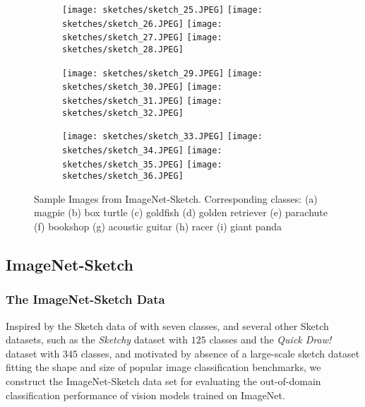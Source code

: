 \documentclass{article}
\begin{document}
\begin{figure}
\begin{subfigure}{.1\textwidth}
  \centering
  \texttt{[image: sketches/sketch\_25.JPEG]}
  \texttt{[image: sketches/sketch\_26.JPEG]}
  \texttt{[image: sketches/sketch\_27.JPEG]}
  \texttt{[image: sketches/sketch\_28.JPEG]}
  \caption{}
\end{subfigure}
\begin{subfigure}{.1\textwidth}
  \centering
  \texttt{[image: sketches/sketch\_29.JPEG]}
  \texttt{[image: sketches/sketch\_30.JPEG]}
  \texttt{[image: sketches/sketch\_31.JPEG]}
  \texttt{[image: sketches/sketch\_32.JPEG]}
  \caption{}
\end{subfigure}
\begin{subfigure}{.1\textwidth}
  \centering
  \texttt{[image: sketches/sketch\_33.JPEG]}
  \texttt{[image: sketches/sketch\_34.JPEG]}
  \texttt{[image: sketches/sketch\_35.JPEG]}
  \texttt{[image: sketches/sketch\_36.JPEG]}
  \caption{}
\end{subfigure}

\caption{Sample Images from ImageNet-Sketch. Corresponding classes: (a) magpie (b) box turtle (c) goldfish (d) golden retriever (e) parachute (f) bookshop (g) acoustic guitar (h) racer (i) giant panda}
\label{fig:sketch}
\end{figure}

\subsection{ImageNet-Sketch}
\subsubsection{The ImageNet-Sketch Data}
Inspired by the Sketch data of \citep{li2017deeper} with seven classes, 
and several other Sketch datasets, 
such as the \emph{Sketchy} dataset \citep{sketchy2016} 
with $125$ classes and the \emph{Quick Draw!}
dataset \citep{quickdraw2018} with $345$ classes, 
and motivated by absence of a large-scale sketch dataset 
fitting the shape and size of popular image classification benchmarks,
we construct the ImageNet-Sketch data set for evaluating 
the out-of-domain classification performance of vision models trained on ImageNet. 
\end{document}

